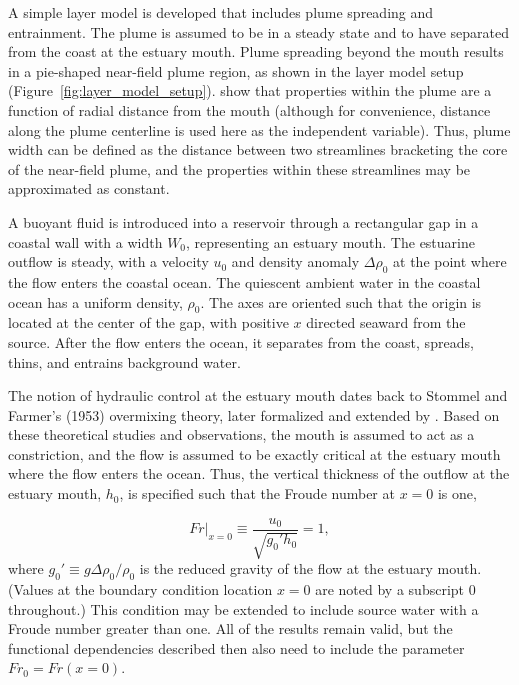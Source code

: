 \documentclass[11pt]{report}
\numberwithin{equation}{section}
\begin{document}
A simple layer model is developed that includes plume spreading and entrainment.  The plume is assumed to be in a steady state and to have separated from the coast at the estuary mouth.  Plume spreading beyond the mouth results in a pie-shaped near-field plume region, as shown in the layer model setup (Figure~\ref{fig:layer_model_setup}).  \citet{hetland.macdonald:08} show that properties within the plume are a function of radial distance from the mouth (although for convenience, distance along the plume centerline is used here as the independent variable).  Thus,  plume width can be defined as the distance between two streamlines bracketing the core of the near-field plume, and the properties within these streamlines may be approximated as constant.

A buoyant fluid is introduced into a reservoir through a rectangular gap in a coastal wall with a width $W_0$, representing an estuary mouth.  The estuarine outflow is steady, with a velocity $u_0$ and density anomaly $\Delta\rho_0$ at the point where the flow enters the coastal ocean.  The quiescent ambient water in the coastal ocean has a uniform density, $\rho_0$.  The axes are oriented such that the origin is located at the center of the gap, with positive $x$ directed seaward from the source.  After the flow enters the ocean, it separates from the coast, spreads, thins, and entrains background water.

The notion of hydraulic control at the estuary mouth dates back to Stommel and Farmer's (1953) overmixing theory, later formalized and extended by \citet{armi.farmer:86}.\nocite{stommel.farmer:53}  Based on these theoretical studies and observations, the mouth is assumed to act as a constriction, and the flow is assumed to be exactly critical at the estuary mouth where the flow enters the ocean. Thus, the vertical thickness of the outflow at the estuary mouth, $h_0$, is specified such that the Froude number at $x=0$ is one, 

\begin{equation}
Fr\bigg|_{x=0}\equiv \frac{u_0}{\sqrt{g_0' h_0}} = 1, \label{eq:ic}
\end{equation}
where $g_0' \equiv g \Delta\rho_0 / \rho_0$ is the reduced gravity of the flow at the estuary mouth.  (Values at the boundary condition location $x=0$ are noted by a subscript $0$ throughout.)  This condition may be extended to include source water with a Froude number greater than one.  All of the results remain valid, but the functional dependencies described then also need to include the parameter $Fr_0 = Fr(x=0)$.
\end{document}
